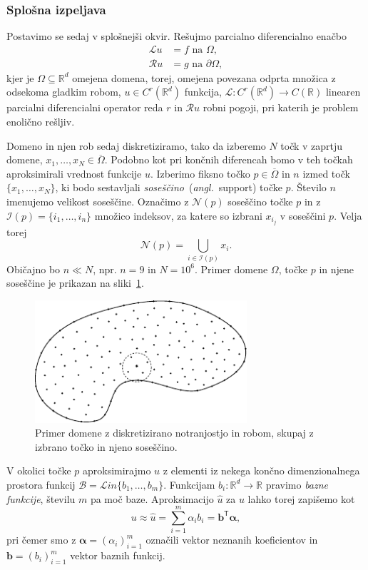 \documentclass[a4paper,twoside]{article}
\theoremstyle{definition} %
\theoremstyle{plain} %
\numberwithin{equation}{section}
\newcommand{\R}{\mathbb R}
\newcommand{\Rc}{\mathcal{R}}
\newcommand{\Nc}{\mathcal{N}}
\newcommand{\I}{\mathcal{I}}
\newcommand{\B}{\mathcal{B}}
\renewcommand{\L}{\mathcal{L}}
\newcommand{\T}{\mathsf{T}}
\renewcommand{\b}{\boldsymbol}
\newcommand{\zomega}{\overline{\Omega}}
\newcommand{\Lin}{\mathcal{L}in}
\newcommand{\uh}{\hat{u}}
\newcommand{\ang}[1]{(\textit{angl.}\ #1)}
\begin{document}
\subsubsection{Splošna izpeljava}
\label{sec:splosna-izpeljava}
Postavimo se sedaj v splošnejši okvir.
Rešujmo parcialno diferencialno enačbo
\begin{align}
  \L u &= f \text{ na } \Omega, \label{eq:general-problem} \\
  \Rc u &= g \text{ na } \partial \Omega \nonumber,
\end{align}
kjer je $\Omega \subseteq \R^d$ omejena domena, torej, omejena povezana odprta
množica z odsekoma gladkim robom, $u \in C^r(\R^d)$ funkcija,
$\L\colon C^r(\R^d) \to C(\R)$ linearen
parcialni diferencialni operator reda $r$ in $\Rc u$ robni pogoji,
pri katerih je problem enolično rešljiv.

Domeno in njen rob sedaj diskretiziramo, tako da izberemo $N$ točk v zaprtju
domene, $x_1, \dots, x_N \in \zomega$. Podobno kot pri končnih
diferencah bomo v teh točkah aproksimirali vrednost funkcije $u$.
Izberimo fiksno točko $p \in \zomega$ in $n$ izmed točk $\{x_1, \dots, x_N\}$,
ki bodo sestavljali \emph{soseščino}~\ang{support} točke $p$. Število $n$ imenujemo
velikost soseščine. Označimo z $\Nc(p)$ soseščino točke $p$ in
z $\I(p) = \{i_1, \dots, i_n\}$ množico indeksov, za katere so izbrani
$x_{i_j}$ v soseščini $p$. Velja torej \[
  \Nc(p) = \bigcup_{i \in \I(p)} x_i.
\]
Običajno bo $n \ll N$, npr. $n = 9$ in $N = 10^6$.
Primer domene $\Omega$, točke $p$ in njene soseščine je prikazan na
sliki~\ref{fig:domain-example}.

\begin{figure}[ht]
  \centering
  \includegraphics[width=0.7\textwidth]{images/domain_theoretical.pdf}
  \caption{Primer domene z diskretizirano notranjostjo in robom, skupaj z izbrano
  točko in njeno soseščino.}
  \label{fig:domain-example}
\end{figure}

V okolici točke $p$ aproksimirajmo $u$ z elementi iz nekega končno
dimenzionalnega prostora funkcij $\B = \Lin\{b_1, \dots, b_m\}$.
Funkcijam $b_i\colon \R^d \to \R$ pravimo \emph{bazne funkcije},
številu $m$ pa moč baze. Aproksimacijo $\uh$ za $u$ lahko torej zapišemo kot
\[
  u \approx \uh = \sum_{i=1}^m \alpha_i b_i = \b{b}^\T \b{\alpha},
\]
pri čemer smo z $\b{\alpha} = (\alpha_i)_{i=1}^m$ označili vektor neznanih
koeficientov in $\b{b} = (b_i)_{i=1}^m$ vektor baznih funkcij.
\end{document}
